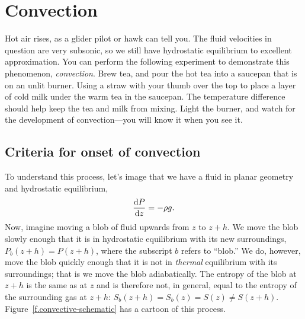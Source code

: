 \chapter{Convection}\label{s.convection}

Hot air rises, as a glider pilot or hawk can tell you. The fluid velocities in question are very subsonic, so we still have hydrostatic equilibrium to excellent approximation. You can perform the following experiment to demonstrate this phenomenon, \emph{convection}.  Brew tea, and pour the hot tea into a saucepan that is on an unlit burner.  Using a straw with your thumb over the top to place a layer of cold milk under the warm tea in the saucepan.  The temperature difference should help keep the tea and milk from mixing.   Light the burner, and watch for the development of convection---you will know it when you see it.

\section{Criteria for onset of convection}\label{s.convection-onset}

To understand this process, let's image that we have a fluid in planar geometry and hydrostatic equilibrium,
\begin{equation}
\frac{\mathrm{d} P}{\mathrm{d} z} = -\rho g.
\end{equation}
Now, imagine moving a blob of fluid upwards from $z$ to $z+h$.  We move the blob slowly enough that it is in hydrostatic equilibrium with its new surroundings, $P_{b}(z+h) = P(z+h)$, where the subscript $b$ refers to ``blob.'' We do, however, move the blob quickly enough that it is not in \emph{thermal} equilibrium with its surroundings; that is we move the blob adiabatically.  The entropy of the blob at $z+h$ is the same as at $z$ and is therefore not, in general, equal to the entropy of the surrounding gas at $z+h$: $S_{b}(z+h) = S_{b}(z) = S(z) \neq S(z+h)$.  Figure~\ref{f.convective-schematic} has a cartoon of this process.

